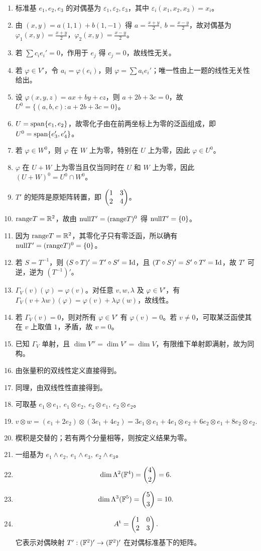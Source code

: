 \begin{enumerate}[label=\textbf{\arabic*.}, leftmargin=*, itemsep=0.5em] \item 标准基 $e_1,e_2,e_3$ 的对偶基为 $\varepsilon_1,\varepsilon_2,\varepsilon_3$，其中 $\varepsilon_i(x_1,x_2,x_3)=x_i$。 \item 由 $(x,y)=a(1,1)+b(1,-1)$ 得 $a=\frac{x+y}{2},\ b=\frac{x-y}{2}$，故对偶基为 $\varphi_1(x,y)=\frac{x+y}{2}$，$\varphi_2(x,y)=\frac{x-y}{2}$。 \item 若 $\sum c_i e_i'=0$，作用于 $e_j$ 得 $c_j=0$，故线性无关。 \item 若 $\varphi\in V'$，令 $a_i=\varphi(e_i)$，则 $\varphi=\sum a_i e_i'$；唯一性由上一题的线性无关性给出。 \item 设 $\varphi(x,y,z)=ax+by+cz$，则 $a+2b+3c=0$，故 $U^0=\{(a,b,c):a+2b+3c=0\}$。 \item $U=\operatorname{span}\{e_1,e_2\}$，故零化子由在前两坐标上为零的泛函组成，即 $U^0=\operatorname{span}\{e_3',e_4'\}$。 \item 若 $\varphi\in W^0$，则 $\varphi$ 在 $W$ 上为零，特别在 $U$ 上为零，因此 $\varphi\in U^0$。 \item $\varphi$ 在 $U+W$ 上为零当且仅当同时在 $U$ 和 $W$ 上为零，因此 $(U+W)^0=U^0\cap W^0$。 \item $T'$ 的矩阵是原矩阵转置，即 $\begin{pmatrix} 1&3\\2&4 \end{pmatrix}$。 \item $\mathrm{range} T=\mathbb{R}^2$，故由 $\mathrm{null} T'=(\mathrm{range} T)^0$ 得 $\mathrm{null} T'=\{0\}$。 \item 因为 $\mathrm{range} T=\mathbb{R}^2$，其零化子只有零泛函，所以确有 $\mathrm{null} T'=(\mathrm{range} T)^0=\{0\}$。 \item 若 $S=T^{-1}$，则 $(S\circ T)'=T'\circ S'=\mathrm{Id}$，且 $(T\circ S)'=S'\circ T'=\mathrm{Id}$，故 $T'$ 可逆，逆为 $(T^{-1})'$。 \item $\Gamma_V(v)(\varphi)=\varphi(v)$。对任意 $v,w,\lambda$ 及 $\varphi\in V'$，有 $\Gamma_V(v+\lambda w)(\varphi)=\varphi(v)+\lambda\varphi(w)$，故线性。 \item 若 $\Gamma_V(v)=0$，则对所有 $\varphi\in V'$ 有 $\varphi(v)=0$。若 $v\neq 0$，可取某泛函使其在 $v$ 上取值 $1$，矛盾，故 $v=0$。 \item 已知 $\Gamma_V$ 单射，且 $\dim V''=\dim V'=\dim V$，有限维下单射即满射，故为同构。 \item 由张量积的双线性定义直接得到。 \item 同理，由双线性性直接得到。 \item 可取基 $e_1\otimes e_1,\ e_1\otimes e_2,\ e_2\otimes e_1,\ e_2\otimes e_2$。 \item \[ v\otimes w=(e_1+2e_2)\otimes(3e_1+4e_2) =3e_1\otimes e_1+4e_1\otimes e_2+6e_2\otimes e_1+8e_2\otimes e_2. \] \item 楔积是交替的；若有两个分量相等，则按定义结果为零。 \item 一组基为 $e_1\wedge e_2,\ e_1\wedge e_3,\ e_2\wedge e_3$。 \item \[ \dim\Lambda^2(\mathbb{F}^4)=\binom{4}{2}=6. \] \item \[ \dim\Lambda^3(\mathbb{F}^5)=\binom{5}{3}=10. \] \item \[ A^{\mathrm t}=\begin{pmatrix} 1&0\\2&3 \end{pmatrix}. \] 它表示对偶映射 $T':(\mathbb{F}^2)'\to(\mathbb{F}^2)'$ 在对偶标准基下的矩阵。 \end{enumerate}
